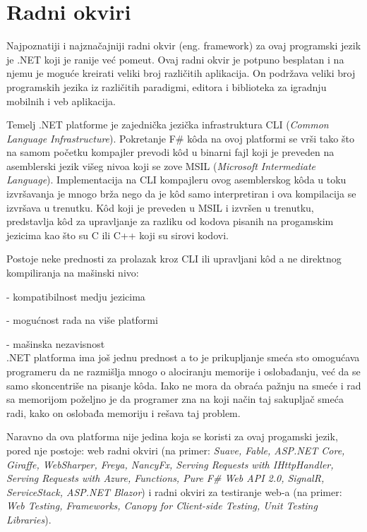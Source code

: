 \documentclass[a4paper]{article}
\begin{document}
\section{Radni okviri}
Najpoznatiji i najznačajniji radni okvir (eng. framework) za ovaj programski jezik je .NET koji je ranije već pomeut. Ovaj radni okvir je potpuno besplatan i na njemu je moguće kreirati veliki broj različitih aplikacija. On podržava veliki broj programskih jezika iz različitih paradigmi, editora i biblioteka za igradnju mobilnih i veb aplikacija. 

Temelj .NET platforme je zajednička jezička infrastruktura CLI ({\em Common Language Infrastructure}). Pokretanje F\# kôda na ovoj platformi se vrši tako što na samom početku kompajler prevodi kôd u binarni fajl koji je preveden na asemblerski jezik višeg nivoa koji se zove MSIL ({\em Microsoft Intermediate Language}). Implementacija na CLI kompajleru ovog asemblerskog kôda u toku izvršavanja je mnogo brža nego da je kôd samo interpretiran i ova kompilacija se izvršava u trenutku\cite{progFs}.
Kôd koji je preveden u MSIL i izvršen u trenutku, predstavlja kôd za upravljanje za razliku od kodova pisanih na progamskim jezicima kao što su C ili C++ koji su sirovi kodovi.   

Postoje neke prednosti za prolazak kroz CLI ili upravljani kôd a ne direktnog kompiliranja na mašinski nivo:	

	- kompatibilnost medju jezicima
	
	- mogućnost rada na više platformi
	
	- mašinska nezavisnost
\\

.NET platforma ima još jednu prednost a to je prikupljanje smeća sto omogućava programeru da ne razmišlja mnogo o alociranju memorije i oslobađanju, već da se samo skoncentriše na pisanje kôda. Iako ne mora da obraća pažnju na smeće i rad sa memorijom poželjno je da programer zna na koji način taj sakupljač smeća radi, kako on oslobađa memoriju i rešava taj problem.

Naravno da ova platforma nije jedina koja se koristi za ovaj progamski jezik, pored nje postoje: web radni okviri (na primer: {\em Suave, Fable, ASP.NET Core, Giraffe, WebSharper, Freya, NancyFx, Serving Requests with IHttpHandler, Serving Requests with Azure, Functions, Pure F\# Web API 2.0, SignalR, ServiceStack, ASP.NET Blazor}) i radni okviri za testiranje web-a (na primer: {\em Web Testing, Frameworks, Canopy for Client-side Testing, Unit Testing Libraries})\cite{fwFs}.
\end{document}

